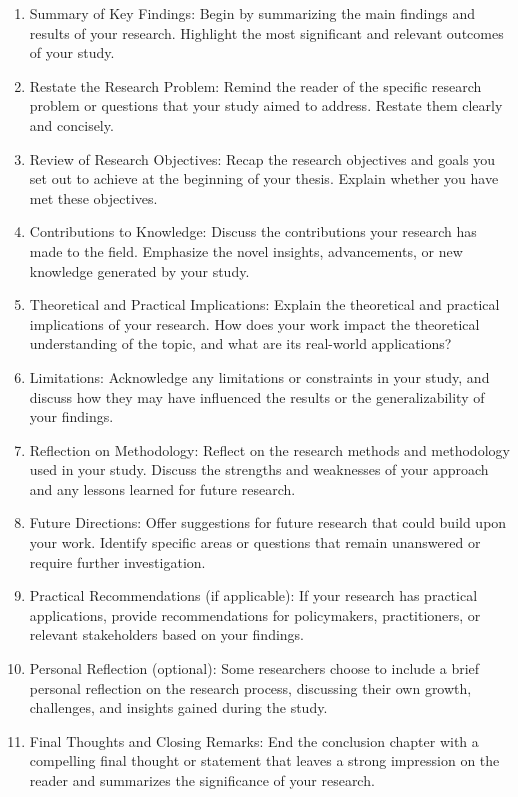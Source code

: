 \begin{enumerate}


\item Summary of Key Findings: Begin by summarizing the main findings and results of your research. Highlight the most significant and relevant outcomes of your study.

\item Restate the Research Problem: Remind the reader of the specific research problem or questions that your study aimed to address. Restate them clearly and concisely.

\item Review of Research Objectives: Recap the research objectives and goals you set out to achieve at the beginning of your thesis. Explain whether you have met these objectives.

\item Contributions to Knowledge: Discuss the contributions your research has made to the field. Emphasize the novel insights, advancements, or new knowledge generated by your study.

\item Theoretical and Practical Implications: Explain the theoretical and practical implications of your research. How does your work impact the theoretical understanding of the topic, and what are its real-world applications?

\item Limitations: Acknowledge any limitations or constraints in your study, and discuss how they may have influenced the results or the generalizability of your findings.

\item Reflection on Methodology: Reflect on the research methods and methodology used in your study. Discuss the strengths and weaknesses of your approach and any lessons learned for future research.

\item Future Directions: Offer suggestions for future research that could build upon your work. Identify specific areas or questions that remain unanswered or require further investigation.

\item Practical Recommendations (if applicable): If your research has practical applications, provide recommendations for policymakers, practitioners, or relevant stakeholders based on your findings.

\item Personal Reflection (optional): Some researchers choose to include a brief personal reflection on the research process, discussing their own growth, challenges, and insights gained during the study.

\item Final Thoughts and Closing Remarks: End the conclusion chapter with a compelling final thought or statement that leaves a strong impression on the reader and summarizes the significance of your research.


\end{enumerate}

